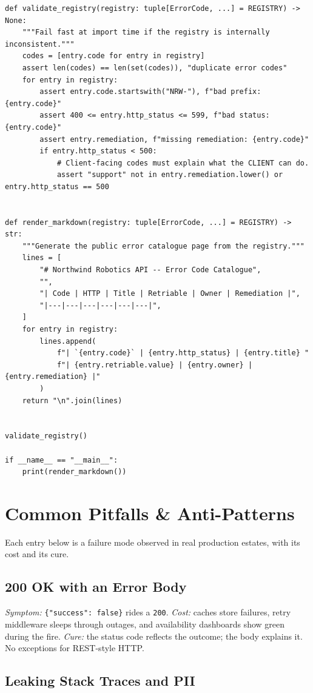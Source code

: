 \begin{verbatim}
def validate_registry(registry: tuple[ErrorCode, ...] = REGISTRY) -> None:
    """Fail fast at import time if the registry is internally inconsistent."""
    codes = [entry.code for entry in registry]
    assert len(codes) == len(set(codes)), "duplicate error codes"
    for entry in registry:
        assert entry.code.startswith("NRW-"), f"bad prefix: {entry.code}"
        assert 400 <= entry.http_status <= 599, f"bad status: {entry.code}"
        assert entry.remediation, f"missing remediation: {entry.code}"
        if entry.http_status < 500:
            # Client-facing codes must explain what the CLIENT can do.
            assert "support" not in entry.remediation.lower() or entry.http_status == 500


def render_markdown(registry: tuple[ErrorCode, ...] = REGISTRY) -> str:
    """Generate the public error catalogue page from the registry."""
    lines = [
        "# Northwind Robotics API -- Error Code Catalogue",
        "",
        "| Code | HTTP | Title | Retriable | Owner | Remediation |",
        "|---|---|---|---|---|---|",
    ]
    for entry in registry:
        lines.append(
            f"| `{entry.code}` | {entry.http_status} | {entry.title} "
            f"| {entry.retriable.value} | {entry.owner} | {entry.remediation} |"
        )
    return "\n".join(lines)


validate_registry()

if __name__ == "__main__":
    print(render_markdown())
\end{verbatim}

\section{Common Pitfalls \& Anti-Patterns}

Each entry below is a failure mode observed in real production estates, with
its cost and its cure.

\subsection*{200 OK with an Error Body}

\emph{Symptom:} \texttt{\{"success": false\}} rides a \texttt{200}.
\emph{Cost:} caches store failures, retry middleware sleeps through outages,
and availability dashboards show green during the fire. \emph{Cure:} the
status code reflects the outcome; the body explains it. No exceptions for
REST-style HTTP.

\subsection*{Leaking Stack Traces and PII}

